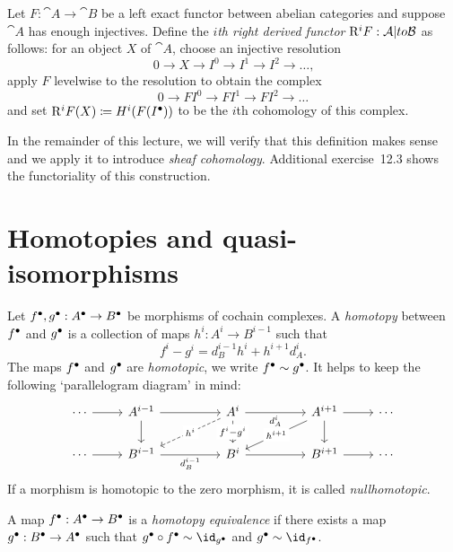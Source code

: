 \begin{defn}
Let \(F\colon\cat A\to\cat B\) be a left exact functor between abelian categories and suppose \(\cat A\) has enough injectives.
Define the \emph{\(i\)th right derived functor} \(\rightderived^iF\colon\cat A|to\cat B\) as follows: for an object \(X\) of \(\cat A\), choose an injective resolution
\[ 0\to X\to I^0\to I^1\to I^2\to\ldots\text{,} \]
apply \(F\) levelwise to the resolution to obtain the complex
\[ 0\to FI^0\to FI^1\to FI^2\to\ldots \]
and set \(\mathrm{R}^iF(X)\coloneq H^i(F(I^\bullet))\) to be the \(i\)th cohomology of this complex.
\end{defn}

In the remainder of this lecture, we will verify that this definition makes sense and we apply it to introduce \emph{sheaf cohomology}.
Additional exercise~12.3 shows the functoriality of this construction.

\section{Homotopies and quasi-isomorphisms}
\begin{defn}
Let ${f}^\bullet, {g}^\bullet: {A}^\bullet \to {B}^\bullet$ be morphisms of cochain complexes. A \emph{homotopy} between ${f}^\bullet$ and ${g}^\bullet$ is a collection of maps $h^i: A^i \to B^{i-1}$ such that \[
	f^i - g^i = d^{i-1}_B h^i + h^{i+1}d^i_A.
\]
The maps ${f}^\bullet$ and ${g}^\bullet$ are \emph{homotopic}, we write ${f}^\bullet \sim {g}^\bullet$. It helps to keep the following `parallelogram diagram' in mind: 
\[\begin{tikzcd}
	{\cdots } & {A^{i-1}} && {A^i} && {A^{i+1}} & \cdots \\
	\cdots & {B^{i-1}} && {B^{i}} && {B^{i+1}} & \cdots
	\arrow[from=1-1, to=1-2]
	\arrow[from=1-2, to=1-4]
	\arrow[from=1-2, to=2-2]
	\arrow["{d^i_A}"', from=1-4, to=1-6]
	\arrow["{h^i}"{description}, dashed, from=1-4, to=2-2]
	\arrow["{f^i - g^i}"{description}, from=1-4, to=2-4]
	\arrow[from=1-6, to=1-7]
	\arrow["{h^{i+1}}"{description}, from=1-6, to=2-4]
	\arrow[from=1-6, to=2-6]
	\arrow[from=2-1, to=2-2]
	\arrow["{d^{i-1}_B}"', from=2-2, to=2-4]
	\arrow[from=2-4, to=2-6]
	\arrow[from=2-6, to=2-7]
\end{tikzcd}\]
If a morphism is homotopic to the zero morphism, it is called \emph{nullhomotopic}.
\end{defn}

\begin{defn}
	A map ${f}^\bullet: {A}^\bullet \to {B}^\bullet$ is a \emph{homotopy equivalence} if there exists a map ${g}^\bullet: {B}^\bullet \to {A}^\bullet$ such that $\cochaincomplex{g} \circ \cochaincomplex{f} \sim \id_{\cochaincomplex{g}}$ and $\cochaincomplex{g} \sim \id_{\cochaincomplex{f}}$. 
\end{defn}


